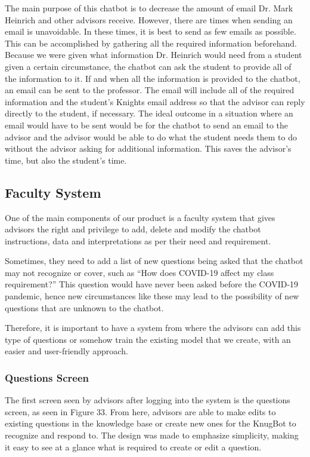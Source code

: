 \documentclass[titlepage, 12pt]{article}
\begin{document}
The main purpose of this chatbot is to decrease the amount of email Dr. Mark Heinrich and other advisors receive. However, there are times when sending an email is unavoidable. In these times, it is best to send as few emails as possible. This can be accomplished by gathering all the required information beforehand. Because we were given what information Dr. Heinrich would need from a student given a certain circumstance, the chatbot can ask the student to provide all of the information to it. If and when all the information is provided to the chatbot, an email can be sent to the professor. The email will include all of the required information and the student’s Knights email address so that the advisor can reply directly to the student, if necessary. The ideal outcome in a situation where an email would have to be sent would be for the chatbot to send an email to the advisor and the advisor would be able to do what the student needs them to do without the advisor asking for additional information. This saves the advisor’s time, but also the student’s time.

\subsection{Faculty System}

One of the main components of our product is a faculty system that gives advisors the right and privilege to add, delete and modify the chatbot instructions, data and interpretations as per their need and requirement. 

Sometimes, they need to add a list of new questions being asked that the chatbot may not recognize or cover, such as “How does COVID-19 affect my class requirement?” This question would have never been asked before the COVID-19 pandemic, hence new circumstances like these may lead to the possibility of new questions that are unknown to the chatbot.

Therefore, it is important to have a system from where the advisors can add this type of questions or somehow train the existing model that we create, with an easier and user-friendly approach.


\subsubsection{Questions Screen}

The first screen seen by advisors after logging into the system is the questions screen, as seen in Figure 33. From here, advisors are able to make edits to existing questions in the knowledge base or create new ones for the KnugBot to recognize and respond to. The design was made to emphasize simplicity, making it easy to see at a glance what is required to create or edit a question.
\end{document}
